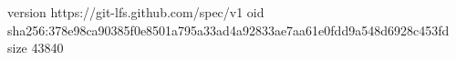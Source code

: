 version https://git-lfs.github.com/spec/v1
oid sha256:378e98ca90385f0e8501a795a33ad4a92833ae7aa61e0fdd9a548d6928c453fd
size 43840
